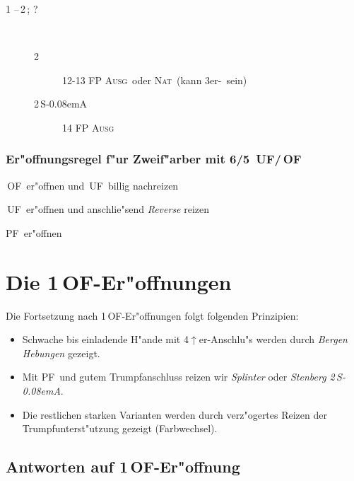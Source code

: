 \documentclass[11pt,german,twocolumn]{scrartcl}
\def\kar{\nobreak\,\Di}
\def\tre{\nobreak\,\Cl}
\def\ka{\Di}
\def\bad{$^-$}
\def\pl{$\uparrow$}
\def\uf{\nobreak\textsf{\,UF}}
\def\of{\nobreak\textsf{\,OF}}
\def\sa{\nobreak\textsf{S\kern-0.08emA}}
\def\SA{\nobreak\,\sa}
\def\sep{\nobreak\,--\,}
\newcommand{\conv}[1]{\emph{#1}}
\def\bal{\textsc{Ausg}}
\def\nat{\textsc{Nat}}
\def\pf{\textsc{PF}}
\def\bdsc{\begin{description}}
\def\edsc{\end{description}}
\newcommand{\Index}[1]{#1\index{#1}}
\begin{document}
\bdsc
  \item[1\kar\sep2\tre; ?]~
    \bdsc
    \item[2\kar] 12-13 FP \bal\ oder \nat\ (kann 3er-\ka\ sein)
    \item[2\SA] 14 FP \bal
    \edsc
\edsc


\subsubsection*{\label{zfregel}Er"offnungsregel f"ur Zweif"arber mit 6/5 \uf/\of}

\bdsc
\setlength{\labelsep}{1ex}
\item[4\pl{} Verlierer:] \of\ er"offnen und \uf\ billig nachreizen
\item[3-4 Verlierer:] \uf\ er"offnen und anschlie"send \conv{Reverse}
  reizen
\item[0-3\bad\ Verlierer:] \pf\ er"offnen
\edsc

\section{Die 1\of-Er"offnungen}

Die Fortsetzung nach 1\of-Er"offnungen folgt folgenden Prinzipien:
\begin{itemize}
\setlength{\itemsep}{0.5ex}
\item Schwache bis einladende H"ande mit 4\pl{}er-Anschlu"s werden durch
  \conv{Bergen Hebungen} gezeigt.
\item Mit \pf\ und gutem Trumpfanschluss reizen wir
  \conv{\Index{Splinter}} oder \conv{Stenberg 2\SA}.
\item Die restlichen starken Varianten werden durch verz"ogertes
  Reizen der Trumpfunterst"utzung gezeigt (Farbwechsel).
\end{itemize}

\subsection{Antworten auf 1\of-Er"offnung}
\end{document}

